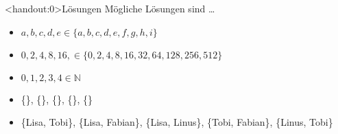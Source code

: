 {
\begin{frame}<handout:0>{Lösungen}
    Mögliche Lösungen sind \dots
  \begin{itemize}[<+- | alert@+>]
        \item $a, b, c, d, e \in \{a, b, c, d, e, f, g, h, i\}$
        \item $0, 2, 4, 8, 16,\in \{0, 2, 4, 8, 16, 32, 64, 128, 256, 512\}$
        \item $0,1,2,3,4 \in \mathbb N$
        \item \{\WashCotton\}, \{\NoWash\}, \{\IroningII\}, \{\Tumbler\}, \{\SpecialForty \}
        \item \{Lisa, Tobi\}, \{Lisa, Fabian\}, \{Lisa, Linus\}, \{Tobi, Fabian\}, \{Linus, Tobi\}
    \end{itemize}
\end{frame}
}
